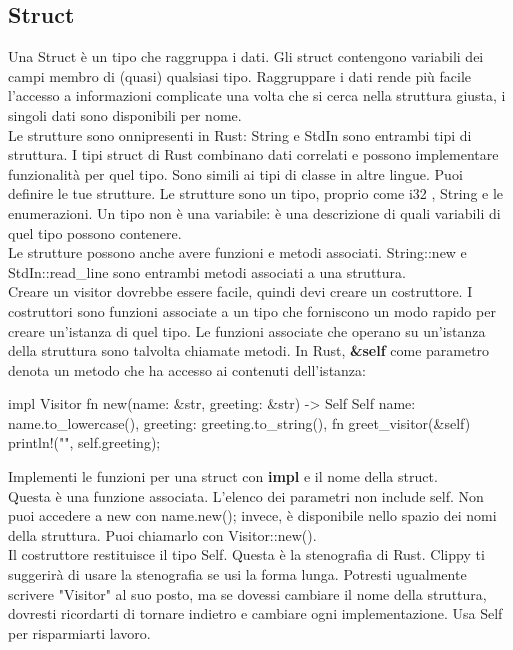 \documentclass[11pt,a4paper]{article}
\begin{document}
\subsection{Struct}
Una Struct è un tipo che raggruppa i dati. Gli struct contengono variabili dei campi membro di (quasi) qualsiasi tipo. Raggruppare i dati rende più facile l'accesso a informazioni complicate una volta che si cerca nella struttura giusta, i singoli dati sono disponibili per nome.\\
Le strutture sono onnipresenti in Rust: String e StdIn sono entrambi tipi di struttura. I tipi struct di Rust combinano dati correlati e possono implementare funzionalità per quel tipo. Sono simili ai tipi di classe in altre lingue.
Puoi definire le tue strutture. Le strutture sono un tipo, proprio come i32 , String e le enumerazioni. Un tipo non è una variabile: è una descrizione di quali variabili di quel tipo possono contenere.\\
Le strutture possono anche avere funzioni e metodi associati. String::new e StdIn::read\_line sono entrambi metodi associati a una struttura.\\
Creare un visitor dovrebbe essere facile, quindi devi creare un costruttore. I costruttori sono funzioni associate a un tipo che forniscono un modo rapido per creare un'istanza di quel tipo. Le funzioni associate che operano su un'istanza della struttura sono talvolta chiamate metodi. In Rust, \textbf{{\color{mauve}\&self}} come parametro denota un metodo che ha accesso ai contenuti dell'istanza:
\begin{rust}
impl Visitor {
	fn new(name: &str, greeting: &str) -> Self {
	Self {
		name: name.to_lowercase(),
		greeting: greeting.to_string(),
	}
}
fn greet_visitor(&self) {
	println!("{}", self.greeting);
	}
}
\end{rust}
Implementi le funzioni per una struct con \textbf{{\color{mauve}impl}} e il nome della struct.\\
Questa è una funzione associata. L'elenco dei parametri non include self. Non puoi accedere a new con name.new(); invece, è disponibile nello spazio dei nomi della struttura. Puoi chiamarlo con Visitor::new().\\
Il costruttore restituisce il tipo Self. Questa è la stenografia di Rust. Clippy ti suggerirà di usare la stenografia se usi la forma lunga. Potresti ugualmente scrivere "Visitor" al suo posto, ma se dovessi cambiare il nome della struttura, dovresti ricordarti di tornare indietro e cambiare ogni implementazione. Usa Self per risparmiarti lavoro.\\
\end{document}
